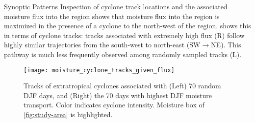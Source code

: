 \begin{block}{Synoptic Patterns}
    Inspection of cyclone track locations and the associated moisture flux into the region shows that moisture flux into the region is maximized in the presence of a cyclone to the north-west of the region.
     shows this in terms of cyclone tracks: tracks associated with extremely high flux (R) follow highly similar trajectories from the south-west to north-east (SW$\rightarrow$NE).
    This pathway is much less frequently observed among randomly sampled tracks (L).
    \begin{figure}
        \texttt{[image: moisture\_cyclone\_tracks\_given\_flux]}
        \caption{Tracks of extratropical cyclones associated with (Left) 70 random DJF days, and (Right) the 70 days with highest DJF moisture transport. Color indicates cyclone intensity. Moisture box of \cref{fig:study-area} is highlighted.}
        \label{fig:track-given-flux}
    \end{figure}
\end{block}
